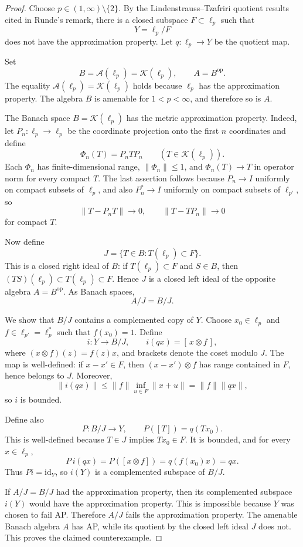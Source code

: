 \documentclass[11pt]{article}
\newcommand{\A}{\mathcal A}
\newcommand{\K}{\mathcal K}
\newcommand{\op}{\mathrm{op}}
\begin{document}
\begin{proof}
Choose \(p\in(1,\infty)\setminus\{2\}\). By the Lindenstrauss--Tzafriri
quotient results cited in Runde's remark, there is a closed subspace
\(F\subset \ell_p\) such that
\[
  Y=\ell_p/F
\]
does not have the approximation property. Let \(q:\ell_p\to Y\) be the quotient
map.

Set
\[
  B=\A(\ell_p)=\K(\ell_p), \qquad A=B^{\op}.
\]
The equality \(\A(\ell_p)=\K(\ell_p)\) holds because \(\ell_p\) has the
approximation property. The algebra \(B\) is amenable for \(1<p<\infty\), and
therefore so is \(A\).

The Banach space \(B=\K(\ell_p)\) has the metric approximation property. Indeed,
let \(P_n:\ell_p\to\ell_p\) be the coordinate projection onto the first \(n\)
coordinates and define
\[
  \Phi_n(T)=P_nTP_n \qquad (T\in \K(\ell_p)).
\]
Each \(\Phi_n\) has finite-dimensional range, \(\|\Phi_n\|\le1\), and
\(\Phi_n(T)\to T\) in operator norm for every compact \(T\). The last assertion
follows because \(P_n\to I\) uniformly on compact subsets of \(\ell_p\), and
also \(P_n^*\to I\) uniformly on compact subsets of \(\ell_{p'}\), so
\[
  \|T-P_nT\|\to0,\qquad \|T-TP_n\|\to0
\]
for compact \(T\).

Now define
\[
  J=\{T\in B: T(\ell_p)\subset F\}.
\]
This is a closed right ideal of \(B\): if \(T(\ell_p)\subset F\) and \(S\in B\),
then \((TS)(\ell_p)\subset T(\ell_p)\subset F\). Hence \(J\) is a closed left
ideal of the opposite algebra \(A=B^{\op}\). As Banach spaces,
\[
  A/J = B/J.
\]

We show that \(B/J\) contains a complemented copy of \(Y\). Choose
\(x_0\in\ell_p\) and \(f\in\ell_{p'}=\ell_p^*\) such that \(f(x_0)=1\). Define
\[
  i:Y\to B/J,\qquad i(qx)=[\,x\otimes f\,],
\]
where \((x\otimes f)(z)=f(z)x\), and brackets denote the coset modulo \(J\).
The map is well-defined: if \(x-x'\in F\), then
\((x-x')\otimes f\) has range contained in \(F\), hence belongs to \(J\).
Moreover,
\[
  \|i(qx)\|\le \|f\|\inf_{u\in F}\|x+u\|=\|f\|\|qx\|,
\]
so \(i\) is bounded.

Define also
\[
  P:B/J\to Y,\qquad P([T])=q(Tx_0).
\]
This is well-defined because \(T\in J\) implies \(Tx_0\in F\). It is bounded,
and for every \(x\in\ell_p\),
\[
  P\,i(qx)=P([x\otimes f])=q(f(x_0)x)=qx.
\]
Thus \(P i=\mathrm{id}_Y\), so \(i(Y)\) is a complemented subspace of \(B/J\).

If \(A/J=B/J\) had the approximation property, then its complemented subspace
\(i(Y)\) would have the approximation property. This is impossible because
\(Y\) was chosen to fail AP. Therefore \(A/J\) fails the approximation property.
The amenable Banach algebra \(A\) has AP, while its quotient by the closed left
ideal \(J\) does not. This proves the claimed counterexample.
\end{proof}
\end{document}
